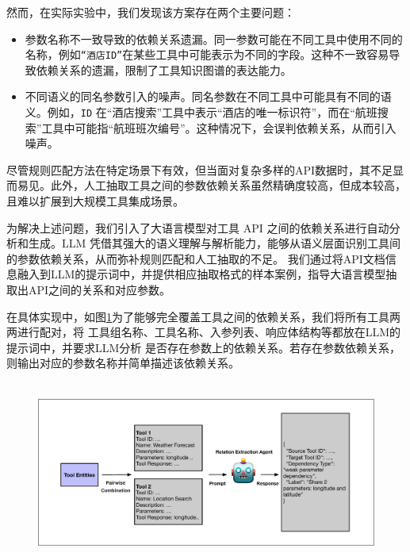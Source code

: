 然而，在实际实验中，我们发现该方案存在两个主要问题：
\begin{itemize}
    \item 参数名称不一致导致的依赖关系遗漏。同一参数可能在不同工具中使用不同的名称，例如\texttt{“酒店ID”}在某些工具中可能表示为不同的字段。这种不一致容易导致依赖关系的遗漏，限制了工具知识图谱的表达能力。
    \item 不同语义的同名参数引入的噪声。同名参数在不同工具中可能具有不同的语义。例如，\texttt{ID} 在“酒店搜索”工具中表示“酒店的唯一标识符”，而在“航班搜索”工具中可能指“航班班次编号”。这种情况下，会误判依赖关系，从而引入噪声。
\end{itemize}

尽管规则匹配方法在特定场景下有效，但当面对复杂多样的API数据时，其不足显而易见。此外，人工抽取工具之间的参数依赖关系虽然精确度较高，但成本较高，且难以扩展到大规模工具集成场景。

为解决上述问题，我们引入了大语言模型对工具 API 之间的依赖关系进行自动分析和生成。LLM 凭借其强大的语义理解与解析能力，能够从语义层面识别工具间的参数依赖关系，从而弥补规则匹配和人工抽取的不足。
我们通过将API文档信息融入到LLM的提示词中，并提供相应抽取格式的样本案例，指导大语言模型抽取出API之间的关系和对应参数。

在具体实现中，如图\ref{fig:relation-extraction}为了能够完全覆盖工具之间的依赖关系，我们将所有工具两两进行配对，将
工具组名称、工具名称、入参列表、响应体结构等都放在LLM的提示词中，并要求LLM分析
是否存在参数上的依赖关系。若存在参数依赖关系，则输出对应的参数名称并简单描述该依赖关系。

\begin{figure}[H]
    \vspace{1em}
    \centering
    \setlength{\abovecaptionskip}{10pt} %
    \includegraphics[height=6cm]{../assets/ch3-llm关系抽取.pdf}
    \label{fig:relation-extraction}
\end{figure}

